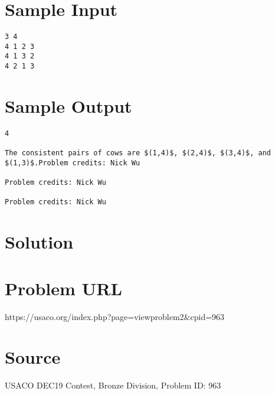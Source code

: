 \documentclass[12pt]{article}
\begin{document}
\section*{Sample Input}
\begin{verbatim}
3 4
4 1 2 3
4 1 3 2
4 2 1 3
\end{verbatim}

\section*{Sample Output}
\begin{verbatim}
4

The consistent pairs of cows are $(1,4)$, $(2,4)$, $(3,4)$, and $(1,3)$.Problem credits: Nick Wu

Problem credits: Nick Wu

Problem credits: Nick Wu
\end{verbatim}

\section*{Solution}


\section*{Problem URL}
https://usaco.org/index.php?page=viewproblem2&cpid=963

\section*{Source}
USACO DEC19 Contest, Bronze Division, Problem ID: 963
\end{document}
